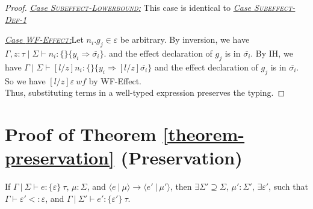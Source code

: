 \begin{proof}
\noindent\underline{\textit{Case \textsc{Subeffect-Lowerbound}:}}
This case is identical to \underline{\textit{Case \textsc{Subeffect-Def-1}}}


\noindent\underline{\textit{Case \textsc{WF-Effect}:}}Let $n_i.g_j \in \varepsilon$ be arbitrary. By inversion, we have
$\Gamma, z : \tau \mid \Sigma \vdash n_i : \{\} \{y_i \Rightarrow \overline{\sigma_i}\}$.
and the effect declaration of $g_j$ is in $\overline{\sigma_i}$. 
By IH, we have 
$\Gamma \mid \Sigma \vdash [l/z]n_i : \{\} \{y_i \Rightarrow [l/z]\overline{\sigma_i}\}$
and the effect declaration of $g_j$ is in $\overline{\sigma_i}$. So we have $[l/z]\varepsilon\ wf$ by WF-Effect. \\[3ex]


\noindent Thus, substituting terms in a well-typed expression preserves the typing.
\end{proof}


\section{Proof of Theorem \ref{theorem-preservation} (Preservation)}
\label{app-preservation}


If \mbox{$\Gamma~|~\Sigma \vdash e : \{ \varepsilon \}~\tau$}, \mbox{$\mu : \Sigma$}, and \mbox{$\langle e~|~\mu \rangle \longrightarrow \langle e'~|~\mu' \rangle$}, then \mbox{$\exists \Sigma' \supseteq \Sigma$}, \mbox{$\mu' : \Sigma'$}, $\exists \varepsilon'$, such that $\Gamma \vdash \varepsilon' <: \varepsilon$, and \mbox{$\Gamma~|~\Sigma' \vdash e' : \{ \varepsilon' \}~\tau$}.


